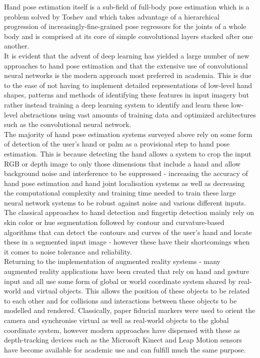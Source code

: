 Hand pose estimation itself is a sub-field of full-body pose estimation which is a problem solved by Toshev \cite{deep_pose} and which takes advantage of a hierarchical progression of increasingly-fine-grained pose regressors for the joints of a whole body and is comprised at its core of simple convolutional layers stacked after one another. \\

It is evident that the advent of deep learning has yielded a large number of new approaches to hand pose estimation and that the extensive use of convolutional neural networks is the modern approach most preferred in academia. This is due to the ease of not having to implement detailed representations of low-level hand shapes, patterns and methods of identifying these features in input imagery but rather instead training a deep learning system to identify and learn these low-level abstractions using vast amounts of training data and optimized architectures such as the convolutional neural network. \\

The majority of hand pose estimation systems surveyed above rely on some form of detection of the user's hand or palm as a provisional step to hand pose estimation. This is because detecting the hand allows a system to crop the input RGB or depth image to only those dimensions that include a hand and allow background noise and interference to be suppressed - increasing the accuracy of hand pose estimation and hand joint localisation systems as well as decreasing the computational complexity and training time needed to train these large neural network systems to be robust against noise and various different inputs. The classical approaches to hand detection and fingertip detection mainly rely on skin color or hue segmentation followed by contour and curvature-based algorithms that can detect the contours and curves of the user's hand and locate these in a segmented input image - however these have their shortcomings when it comes to noise tolerance and reliability. \\

Returning to the implementation of augmented reality systems - many augmented reality applications have been created that rely on hand and gesture input and all use some form of global or world coordinate system shared by real-world and virtual objects. This allows the position of these objects to be related to each other and for collisions and interactions between these objects to be modelled and rendered. Classically, paper fiducial markers were used to orient the camera and synchronise virtual as well as real-world objects to the global coordinate system, however modern approaches have dispensed with these as depth-tracking devices such as the Microsoft Kinect and Leap Motion sensors have become available for academic use and can fulfill much the same purpose. \\

